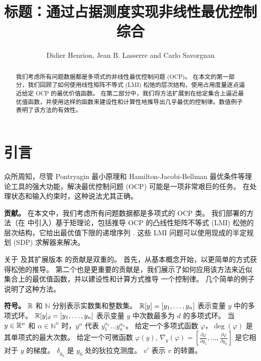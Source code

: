 \begin{translation}
\label{cha:translation}

\title{标题：通过占据测度实现非线性最优控制综合}
\author{Didier Henrion, Jean B. Lasserre and Carlo Savorgnan}
\maketitle

\begin{abstract}
  我们考虑所有问题数据都是多项式的非线性最优控制问题 (OCP)。 在本文的第一部分，我们回顾了如何使用线性矩阵不等式 (LMI) 松弛的层次结构，使用占用度量逐点逼近给定 OCP 的最优价值函数。 在第二部分中，我们将方法扩展到在给定集合上逼近最优值函数，并使用这样的函数来建设性和计算性地推导出几乎最优的控制律。数值例子表明了该方法的有效性。
\end{abstract}

\section{引言}

众所周知，尽管 Pontryagin 最小原理和 Hamilton-Jacobi-Bellman 最优条件等理论工具的强大功能，解决最优控制问题 (OCP) 可能是一项非常艰巨的任务。
在处理状态和输入约束时，这种说法尤其正确。


\textbf{贡献。} 在本文中，我们考虑所有问题数据都是多项式的 OCP 类。
我们部署的方法（在 \cite{LasPriHen2005} 中引入）基于矩理论，包括推导 OCP 的凸线性矩阵不等式 (LMI) 松弛的层次结构，它给出最优值下限的递增序列 . 这些 LMI 问题可以使用现成的半定规划 (SDP) 求解器来解决。

关于 \cite{LasPriHen2005} 及其扩展版本 \cite{LasHenPriTre2008} 的贡献是双重的。 首先，从基本概念开始，以更简单的方式获得松弛的推导。 第二个也是更重要的贡献是，我们展示了如何应用该方法来近似集合上的最优值函数，并以建设性和计算方式推导
一个控制律。 几个简单的例子说明了这种方法。

\textbf{符号。}
$\mathbb{R}$ 和 $\mathbb{N}$ 分别表示实数集和整数集。
$\mathbb{R}[y]=[y_1, \dots , y_n]$ 表示变量 $y$ 中的多项式环。
$\mathbb{R}[y]_d=[y_1, \dots , y_n]$ 表示变量 $y$ 中次数最多为 $d$ 的多项式环。
当 $y \in \mathbb{R}^n$ 和 $\alpha\in\mathbb{N}^n$ 时，$y^\alpha$ 代表 $y_1^{\alpha_1} \dots y_n^{\alpha_n}$。
给定一个多项式函数 $\varphi$，$\deg(\varphi)$ 是其单项式的最大次数。
给定一个可微函数 $\varphi(y)$, $\nabla_y(\varphi)=[\frac{\partial\varphi}{\partial y_1}, \dots ,\frac{\partial\varphi}{\partial y_n }]$ 是它相对于 $y$ 的梯度。
$\delta_{y_0}$ 是 $y_0$ 处的狄拉克测度。
$v'$ 表示 $v$ 的转置。


\end{translation}
